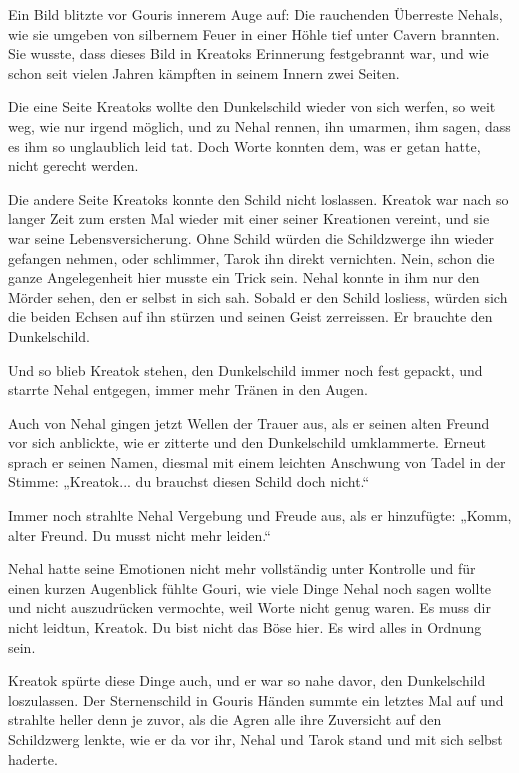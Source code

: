Ein Bild blitzte vor Gouris innerem Auge auf: Die rauchenden Überreste Nehals, wie sie umgeben von silbernem Feuer in einer Höhle tief unter Cavern brannten. Sie wusste, dass dieses Bild in Kreatoks Erinnerung festgebrannt war, und wie schon seit vielen Jahren kämpften in seinem Innern zwei Seiten.

Die eine Seite Kreatoks wollte den Dunkelschild wieder von sich werfen, so weit weg, wie nur irgend möglich, und zu Nehal rennen, ihn umarmen, ihm sagen, dass es ihm so unglaublich leid tat. Doch Worte konnten dem, was er getan hatte, nicht gerecht werden.

Die andere Seite Kreatoks konnte den Schild nicht loslassen. Kreatok war nach so langer Zeit zum ersten Mal wieder mit einer seiner Kreationen vereint, und sie war seine Lebensversicherung. Ohne Schild würden die Schildzwerge ihn wieder gefangen nehmen, oder schlimmer, Tarok ihn direkt vernichten. Nein, schon die ganze Angelegenheit hier musste ein Trick sein. Nehal konnte in ihm nur den Mörder sehen, den er selbst in sich sah. Sobald er den Schild losliess, würden sich die beiden Echsen auf ihn stürzen und seinen Geist zerreissen. Er brauchte den Dunkelschild.

Und so blieb Kreatok stehen, den Dunkelschild immer noch fest gepackt, und starrte Nehal entgegen, immer mehr Tränen in den Augen.

Auch von Nehal gingen jetzt Wellen der Trauer aus, als er seinen alten Freund vor sich anblickte, wie er zitterte und den Dunkelschild umklammerte. Erneut sprach er seinen Namen, diesmal mit einem leichten Anschwung von Tadel in der Stimme: „Kreatok... du brauchst diesen Schild doch nicht.“

Immer noch strahlte Nehal Vergebung und Freude aus, als er hinzufügte: „Komm, alter Freund. Du musst nicht mehr leiden.“

Nehal hatte seine Emotionen nicht mehr vollständig unter Kontrolle und für einen kurzen Augenblick fühlte Gouri, wie viele Dinge Nehal noch sagen wollte und nicht auszudrücken vermochte, weil Worte nicht genug waren. Es muss dir nicht leidtun, Kreatok. Du bist nicht das Böse hier. Es wird alles in Ordnung sein.

Kreatok spürte diese Dinge auch, und er war so nahe davor, den Dunkelschild loszulassen. Der Sternenschild in Gouris Händen summte ein letztes Mal auf und strahlte heller denn je zuvor, als die Agren alle ihre Zuversicht auf den Schildzwerg lenkte, wie er da vor ihr, Nehal und Tarok stand und mit sich selbst haderte.

